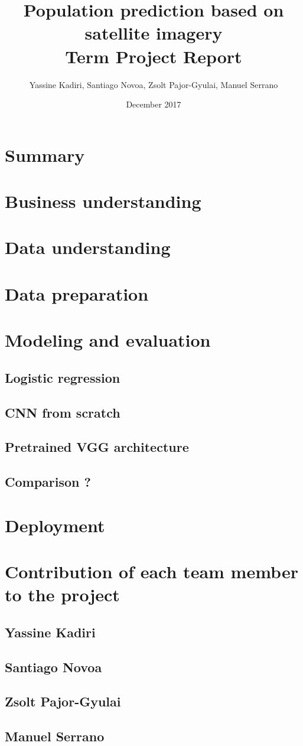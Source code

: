 \documentclass{article}
\begin{document}
\title{Population prediction based on satellite imagery\\
Term Project Report} 

\date{December 2017}
\author{Yassine Kadiri, Santiago Novoa, Zsolt Pajor-Gyulai, Manuel Serrano}
\maketitle

\doublespacing

\section{Summary}
\section{Business understanding}
\section{Data understanding}
\section{Data preparation}
\section{Modeling and evaluation}
\subsection{Logistic regression}
\subsection{CNN from scratch}
\subsection{Pretrained VGG architecture}
\subsection{Comparison ?}
\section{Deployment}
\appendix
\section{Contribution of each team member to the project}
\subsection{Yassine Kadiri}
\subsection{Santiago Novoa}
\subsection{Zsolt Pajor-Gyulai}
\subsection{Manuel Serrano}
\end{document}
